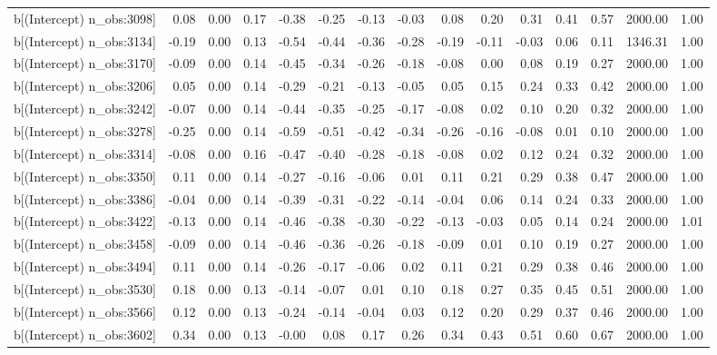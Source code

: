 \begin{table}[ht]
\begin{tabular}{rrrrrrrrrrrrrrr}
  b[(Intercept) n\_obs:3098] & 0.08 & 0.00 & 0.17 & -0.38 & -0.25 & -0.13 & -0.03 & 0.08 & 0.20 & 0.31 & 0.41 & 0.57 & 2000.00 & 1.00 \\ 
  b[(Intercept) n\_obs:3134] & -0.19 & 0.00 & 0.13 & -0.54 & -0.44 & -0.36 & -0.28 & -0.19 & -0.11 & -0.03 & 0.06 & 0.11 & 1346.31 & 1.00 \\ 
  b[(Intercept) n\_obs:3170] & -0.09 & 0.00 & 0.14 & -0.45 & -0.34 & -0.26 & -0.18 & -0.08 & 0.00 & 0.08 & 0.19 & 0.27 & 2000.00 & 1.00 \\ 
  b[(Intercept) n\_obs:3206] & 0.05 & 0.00 & 0.14 & -0.29 & -0.21 & -0.13 & -0.05 & 0.05 & 0.15 & 0.24 & 0.33 & 0.42 & 2000.00 & 1.00 \\ 
  b[(Intercept) n\_obs:3242] & -0.07 & 0.00 & 0.14 & -0.44 & -0.35 & -0.25 & -0.17 & -0.08 & 0.02 & 0.10 & 0.20 & 0.32 & 2000.00 & 1.00 \\ 
  b[(Intercept) n\_obs:3278] & -0.25 & 0.00 & 0.14 & -0.59 & -0.51 & -0.42 & -0.34 & -0.26 & -0.16 & -0.08 & 0.01 & 0.10 & 2000.00 & 1.00 \\ 
  b[(Intercept) n\_obs:3314] & -0.08 & 0.00 & 0.16 & -0.47 & -0.40 & -0.28 & -0.18 & -0.08 & 0.02 & 0.12 & 0.24 & 0.32 & 2000.00 & 1.00 \\ 
  b[(Intercept) n\_obs:3350] & 0.11 & 0.00 & 0.14 & -0.27 & -0.16 & -0.06 & 0.01 & 0.11 & 0.21 & 0.29 & 0.38 & 0.47 & 2000.00 & 1.00 \\ 
  b[(Intercept) n\_obs:3386] & -0.04 & 0.00 & 0.14 & -0.39 & -0.31 & -0.22 & -0.14 & -0.04 & 0.06 & 0.14 & 0.24 & 0.33 & 2000.00 & 1.00 \\ 
  b[(Intercept) n\_obs:3422] & -0.13 & 0.00 & 0.14 & -0.46 & -0.38 & -0.30 & -0.22 & -0.13 & -0.03 & 0.05 & 0.14 & 0.24 & 2000.00 & 1.01 \\ 
  b[(Intercept) n\_obs:3458] & -0.09 & 0.00 & 0.14 & -0.46 & -0.36 & -0.26 & -0.18 & -0.09 & 0.01 & 0.10 & 0.19 & 0.27 & 2000.00 & 1.00 \\ 
  b[(Intercept) n\_obs:3494] & 0.11 & 0.00 & 0.14 & -0.26 & -0.17 & -0.06 & 0.02 & 0.11 & 0.21 & 0.29 & 0.38 & 0.46 & 2000.00 & 1.00 \\ 
  b[(Intercept) n\_obs:3530] & 0.18 & 0.00 & 0.13 & -0.14 & -0.07 & 0.01 & 0.10 & 0.18 & 0.27 & 0.35 & 0.45 & 0.51 & 2000.00 & 1.00 \\ 
  b[(Intercept) n\_obs:3566] & 0.12 & 0.00 & 0.13 & -0.24 & -0.14 & -0.04 & 0.03 & 0.12 & 0.20 & 0.29 & 0.37 & 0.46 & 2000.00 & 1.00 \\ 
  b[(Intercept) n\_obs:3602] & 0.34 & 0.00 & 0.13 & -0.00 & 0.08 & 0.17 & 0.26 & 0.34 & 0.43 & 0.51 & 0.60 & 0.67 & 2000.00 & 1.00 \\ 

\end{tabular}
\end{table}
